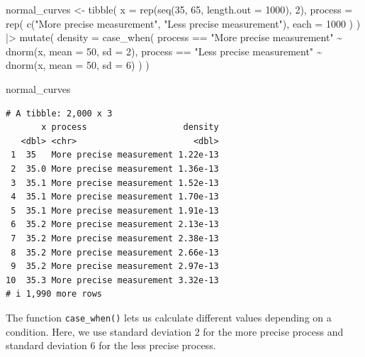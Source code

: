 \documentclass[
  letterpaper,
  DIV=11,
  numbers=noendperiod]{scrreprt}
\newenvironment{Shaded}{\begin{snugshade}}{\end{snugshade}}
\newcommand{\AttributeTok}[1]{\textcolor[rgb]{0.40,0.45,0.13}{#1}}
\newcommand{\DecValTok}[1]{\textcolor[rgb]{0.68,0.00,0.00}{#1}}
\newcommand{\FunctionTok}[1]{\textcolor[rgb]{0.28,0.35,0.67}{#1}}
\newcommand{\NormalTok}[1]{\textcolor[rgb]{0.00,0.23,0.31}{#1}}
\newcommand{\OtherTok}[1]{\textcolor[rgb]{0.00,0.23,0.31}{#1}}
\newcommand{\SpecialCharTok}[1]{\textcolor[rgb]{0.37,0.37,0.37}{#1}}
\newcommand{\StringTok}[1]{\textcolor[rgb]{0.13,0.47,0.30}{#1}}
\begin{document}
\begin{Shaded}
\begin{Highlighting}[]
\NormalTok{normal\_curves }\OtherTok{\textless{}{-}} \FunctionTok{tibble}\NormalTok{(}
  \AttributeTok{x =} \FunctionTok{rep}\NormalTok{(}\FunctionTok{seq}\NormalTok{(}\DecValTok{35}\NormalTok{, }\DecValTok{65}\NormalTok{, }\AttributeTok{length.out =} \DecValTok{1000}\NormalTok{), }\DecValTok{2}\NormalTok{),}
  \AttributeTok{process =} \FunctionTok{rep}\NormalTok{(}
    \FunctionTok{c}\NormalTok{(}\StringTok{"More precise measurement"}\NormalTok{, }\StringTok{"Less precise measurement"}\NormalTok{),}
    \AttributeTok{each =} \DecValTok{1000}
\NormalTok{  )}
\NormalTok{) }\SpecialCharTok{|\textgreater{}}
  \FunctionTok{mutate}\NormalTok{(}
    \AttributeTok{density =} \FunctionTok{case\_when}\NormalTok{(}
\NormalTok{      process }\SpecialCharTok{==} \StringTok{"More precise measurement"} \SpecialCharTok{\textasciitilde{}} \FunctionTok{dnorm}\NormalTok{(x, }\AttributeTok{mean =} \DecValTok{50}\NormalTok{, }\AttributeTok{sd =} \DecValTok{2}\NormalTok{),}
\NormalTok{      process }\SpecialCharTok{==} \StringTok{"Less precise measurement"} \SpecialCharTok{\textasciitilde{}} \FunctionTok{dnorm}\NormalTok{(x, }\AttributeTok{mean =} \DecValTok{50}\NormalTok{, }\AttributeTok{sd =} \DecValTok{6}\NormalTok{)}
\NormalTok{    )}
\NormalTok{  )}

\NormalTok{normal\_curves}
\end{Highlighting}
\end{Shaded}

\begin{verbatim}
# A tibble: 2,000 x 3
       x process                   density
   <dbl> <chr>                       <dbl>
 1  35   More precise measurement 1.22e-13
 2  35.0 More precise measurement 1.36e-13
 3  35.1 More precise measurement 1.52e-13
 4  35.1 More precise measurement 1.70e-13
 5  35.1 More precise measurement 1.91e-13
 6  35.2 More precise measurement 2.13e-13
 7  35.2 More precise measurement 2.38e-13
 8  35.2 More precise measurement 2.66e-13
 9  35.2 More precise measurement 2.97e-13
10  35.3 More precise measurement 3.32e-13
# i 1,990 more rows
\end{verbatim}

The function \texttt{case\_when()} lets us calculate different values
depending on a condition. Here, we use standard deviation 2 for the more
precise process and standard deviation 6 for the less precise process.
\end{document}
